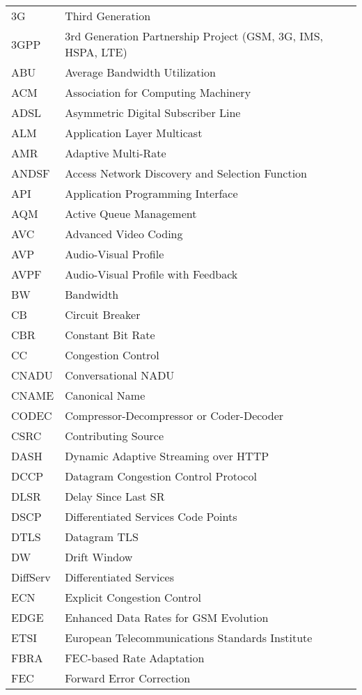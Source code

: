 \begin{longtable}{ll}
3G  	& Third Generation \\
3GPP 	& 3rd Generation Partnership Project (GSM, 3G, IMS, HSPA, LTE)\\
ABU 	& Average Bandwidth Utilization \\
ACM 	& Association for Computing Machinery \\
ADSL 	& Asymmetric Digital Subscriber Line \\
ALM 	& Application Layer Multicast \\
AMR 	& Adaptive Multi-Rate \\
ANDSF & Access Network Discovery and Selection Function \\
API 	& Application Programming Interface \\
AQM 	& Active Queue Management \\
AVC 	& Advanced Video Coding \\
AVP 	& Audio-Visual Profile \\
AVPF	& Audio-Visual Profile with Feedback \\
BW  	& Bandwidth \\
CB  	& Circuit Breaker \\
CBR 	& Constant Bit Rate \\
CC  	& Congestion Control \\
CNADU	& Conversational NADU \\
CNAME	& Canonical Name \\
CODEC	& Compressor-Decompressor or Coder-Decoder \\
CSRC 	& Contributing Source \\
DASH 	& Dynamic Adaptive Streaming over HTTP \\
DCCP 	& Datagram Congestion Control Protocol \\
DLSR 	& Delay Since Last SR \\
DSCP 	& Differentiated Services Code Points \\
DTLS 	& Datagram TLS \\
DW  	& Drift Window \\
DiffServ	& Differentiated Services \\
ECN  	& Explicit Congestion Control \\
EDGE 	& Enhanced Data Rates for GSM Evolution \\
ETSI 	& European Telecommunications Standards Institute \\
FBRA 	& FEC-based Rate Adaptation \\
FEC  	& Forward Error Correction \\

\end{longtable}
